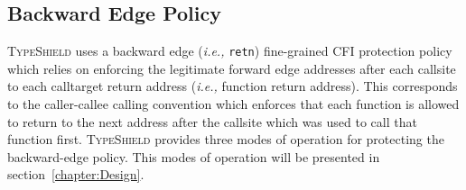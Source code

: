 \subsection{Backward Edge Policy}
\label{Backward Edge CFI Policy}
\textsc{TypeShield} uses a backward edge (\textit{i.e.,} \texttt{retn}) fine-grained CFI protection policy which 
relies on enforcing the legitimate forward edge addresses after each callsite
to each calltarget return address (\textit{i.e.,} function return address). 
This corresponds to the caller-callee calling convention 
which enforces that each function is allowed to return to the next address after the callsite which 
was used to call that function first. \textsc{TypeShield} provides three modes of operation for
protecting the backward-edge policy. 
This modes of operation will be presented in section~\cref{chapter:Design}.

